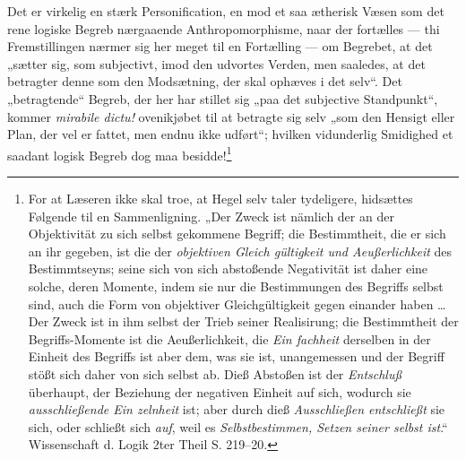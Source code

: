 \documentclass[11pt]{book}
\newcommand{\opage}[1]{\marginnote{\footnotesize\textit{[#1]}}}
\begin{document}
\opage{226} \setcounter{footnote}{0}%
Det er virkelig en stærk Personification, en mod et saa ætherisk Væsen
som det rene logiske Begreb nærgaaende Anthropomorphisme, naar der
fortælles --- thi Fremstillingen nærmer sig her meget til en Fortælling
--- om Begrebet, at det „sætter sig, som subjectivt, imod den udvortes
Verden, men saaledes, at det betragter denne som den Modsætning, der skal
ophæves i det selv“. Det „betragtende“ Begreb, der her har stillet sig
„paa det subjective Standpunkt“, kommer \textit{mirabile dictu!}
ovenikjøbet til at betragte sig selv „som den Hensigt eller Plan, der vel
er fattet, men endnu ikke udført“; hvilken vidunderlig Smidighed et
saadant logisk Begreb dog maa besidde!\footnote{For at Læseren ikke skal
troe, at Hegel selv taler tydeligere, hidsættes Følgende til en
Sammenligning. „Der Zweck ist nämlich der an der Objektivität zu sich
selbst gekommene Begriff; die Bestimmtheit, die er sich an ihr gegeben,
ist die der \emph{objektiven Gleich\-%
gültigkeit und Aeußerlichkeit} des Bestimmtseyns; seine sich von sich
abstoßende Negativität ist daher eine solche, deren Momente, indem sie
nur die Bestimmungen des Begriffs selbst sind, auch die Form von
objektiver Gleichgültigkeit gegen einander haben \dots{} Der Zweck ist in
ihm selbst der Trieb seiner Realisirung; die Bestimmtheit der
Begriffs-Momente ist die Aeußerlichkeit, die \emph{Ein\-%
fachheit} derselben in der Einheit des Begriffs ist aber dem, was sie
ist, unangemessen und der Begriff stößt sich daher von sich selbst ab.
Dieß Abstoßen ist der \emph{Entschluß} überhaupt, der Beziehung der
negativen Einheit auf sich, wodurch sie \emph{ausschließende Ein\-%
zelnheit} ist; aber durch dieß \emph{Ausschließen entschließt} sie sich,
oder schließt sich \emph{auf}, weil es \emph{Selbstbestimmen, Setzen
seiner selbst ist}.“ Wissenschaft d. Logik 2ter Theil S. 219--20.}
\end{document}
